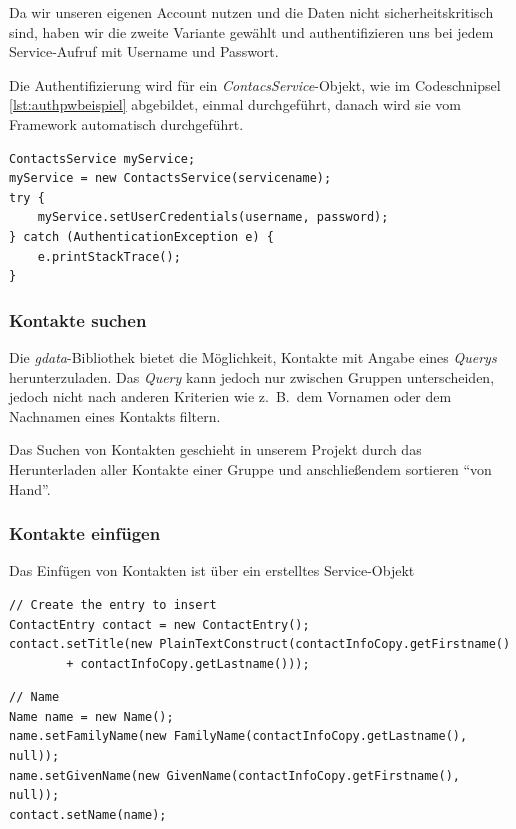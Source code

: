 Da wir unseren eigenen Account nutzen und die Daten nicht sicherheitskritisch sind, haben
 wir die zweite Variante gew\"ahlt und authentifizieren uns bei jedem Service-Aufruf mit
 Username und Passwort.

Die Authentifizierung wird für ein \emph{ContacsService}-Objekt, wie im Codeschnipsel
 \ref{lst:authpwbeispiel} abgebildet, einmal durchgeführt, danach wird sie vom Framework
 automatisch durchgeführt.

\begin{lstlisting}
ContactsService myService;
myService = new ContactsService(servicename);
try {
	myService.setUserCredentials(username, password);
} catch (AuthenticationException e) {
	e.printStackTrace();
}
\end{lstlisting}

\subsubsection{Kontakte suchen}
Die \emph{gdata}-Bibliothek bietet die Möglichkeit, Kontakte mit Angabe eines \emph{Querys}
 herunterzuladen.
Das \emph{Query} kann jedoch nur zwischen Gruppen unterscheiden, jedoch nicht nach anderen
 Kriterien wie z.\ B.\ dem Vornamen oder dem Nachnamen eines Kontakts filtern.

Das Suchen von Kontakten geschieht in unserem Projekt durch das Herunterladen aller Kontakte
 einer Gruppe und anschließendem sortieren "`von Hand"'.

\subsubsection{Kontakte einf\"ugen}
Das Einfügen von Kontakten ist über ein erstelltes Service-Objekt 

\begin{lstlisting}
// Create the entry to insert
ContactEntry contact = new ContactEntry();
contact.setTitle(new PlainTextConstruct(contactInfoCopy.getFirstname()
		+ contactInfoCopy.getLastname()));
\end{lstlisting}

\begin{lstlisting}
// Name
Name name = new Name();
name.setFamilyName(new FamilyName(contactInfoCopy.getLastname(), null));
name.setGivenName(new GivenName(contactInfoCopy.getFirstname(), null));
contact.setName(name);
\end{lstlisting}

